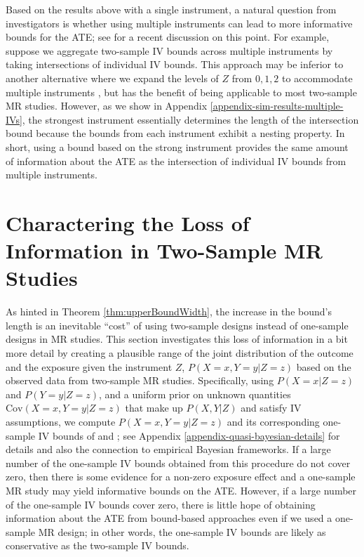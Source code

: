 \documentclass[
]{article}
\theoremstyle{plain}
\begin{document}
Based on the results above with a single instrument, a natural question from investigators is whether using multiple instruments can lead to more informative bounds for the ATE; see \textcite{swanson_commentary_2017} for a recent discussion on this point. For example, suppose we aggregate two-sample IV bounds across multiple instruments by taking intersections of individual IV bounds. This approach may be inferior to another alternative where we expand the levels of \(Z\) from \(0,1,2\) to accommodate multiple instruments \autocite{swanson_commentary_2017}, but has the benefit of being applicable to most two-sample MR studies. However, as we show in Appendix \ref{appendix-sim-results-multiple-IVs}, the strongest instrument essentially determines the length of the intersection bound because the bounds from each instrument exhibit a nesting property. In short, using a bound based on the strong instrument provides the same amount of information about the ATE as the intersection of individual IV bounds from multiple instruments.

\hypertarget{charactering-the-loss-of-information-in-two-sample-mr-studies}{%
\section{Charactering the Loss of Information in Two-Sample MR Studies}\label{charactering-the-loss-of-information-in-two-sample-mr-studies}}

\label{quasi-bayesian}

As hinted in Theorem \ref{thm:upperBoundWidth}, the increase in the bound's length is an inevitable ``cost'' of using two-sample designs instead of one-sample designs in MR studies. This section investigates this loss of information in a bit more detail by creating a plausible range of the joint distribution of the outcome and the exposure given the instrument \(Z\), \(P(X = x, Y = y | Z = z)\) based on the observed data from two-sample MR studies. Specifically, using \(P(X = x | Z = z)\) and \(P(Y = y | Z = z)\), and a uniform prior on unknown quantities \(\text{Cov}(X = x, Y = y| Z = z)\) that make up \(P(X,Y | Z)\) and satisfy IV assumptions, we compute \(P(X = x, Y = y | Z = z)\) and its corresponding one-sample IV bounds of \textcite{balke_bounds_1997} and \textcite{richardson_ace_2014}; see Appendix \ref{appendix-quasi-bayesian-details} for details and also the connection to empirical Bayesian frameworks. If a large number of the one-sample IV bounds obtained from this procedure do not cover zero, then there is some evidence for a non-zero exposure effect and a one-sample MR study may yield informative bounds on the ATE. However, if a large number of the one-sample IV bounds cover zero, there is little hope of obtaining information about the ATE from bound-based approaches even if we used a one-sample MR design; in other words, the one-sample IV bounds are likely as conservative as the two-sample IV bounds.
\end{document}
